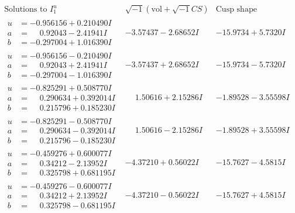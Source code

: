 \documentclass[1p]{elsarticle_modified}
\theoremstyle{definition}
\newcommand{\I}{\sqrt{-1}}
\begin{document}
$$\begin{array}{c|c|c}  
\text{Solutions to }I^u_{1}& \I (\text{vol} + \sqrt{-1}CS) & \text{Cusp shape}\\
 \hline 
\begin{aligned}
u &= -0.956156 + 0.210490 I \\
a &= \phantom{-}0.92043 - 2.41941 I \\
b &= -0.297004 + 1.016390 I\end{aligned}
 & -3.57437 - 2.68652 I & -15.9734 + 5.7320 I \\ \hline\begin{aligned}
u &= -0.956156 - 0.210490 I \\
a &= \phantom{-}0.92043 + 2.41941 I \\
b &= -0.297004 - 1.016390 I\end{aligned}
 & -3.57437 + 2.68652 I & -15.9734 - 5.7320 I \\ \hline\begin{aligned}
u &= -0.825291 + 0.508770 I \\
a &= \phantom{-}0.290634 + 0.392014 I \\
b &= \phantom{-}0.215796 + 0.185230 I\end{aligned}
 & \phantom{-}1.50616 + 2.15286 I & -1.89528 - 3.55598 I \\ \hline\begin{aligned}
u &= -0.825291 - 0.508770 I \\
a &= \phantom{-}0.290634 - 0.392014 I \\
b &= \phantom{-}0.215796 - 0.185230 I\end{aligned}
 & \phantom{-}1.50616 - 2.15286 I & -1.89528 + 3.55598 I \\ \hline\begin{aligned}
u &= -0.459276 + 0.600077 I \\
a &= \phantom{-}0.34212 - 2.13952 I \\
b &= \phantom{-}0.325798 + 0.681195 I\end{aligned}
 & -4.37210 + 0.56022 I & -15.7627 - 4.5815 I \\ \hline\begin{aligned}
u &= -0.459276 - 0.600077 I \\
a &= \phantom{-}0.34212 + 2.13952 I \\
b &= \phantom{-}0.325798 - 0.681195 I\end{aligned}
 & -4.37210 - 0.56022 I & -15.7627 + 4.5815 I \\ \hline\begin{aligned}

\end{aligned}
\end{array}$$
\end{document}
